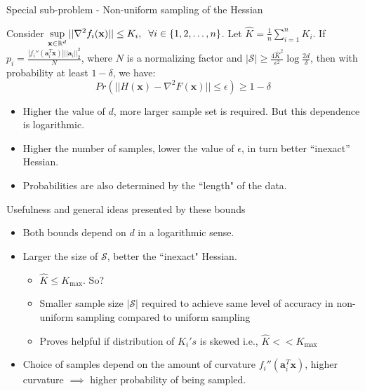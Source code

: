 \documentclass[10pt]{beamer}
\newcommand{\h}{\nabla^{2}}
\newcommand{\xbold}{\mathbf{x}}
\begin{document}
\begin{frame}{Special sub-problem - Non-uniform sampling of the Hessian}
\begin{theorem}
Consider \(\displaystyle \sup_{\xbold\in\mathbb{R}^{d}} ||\h f_{i}(\xbold)|| \leq K_{i}, \hspace{2mm} \forall i \in \{1, 2, \ldots, n\}\). Let \(\hat{K} = \frac{1}{n}\sum_{i=1}^{n} K_{i}\). If \(p_{i} = \displaystyle \frac{|f_{i}''(\mathbf{a}_{i}^{T}\xbold)| ||\mathbf{a}_{i}||^{2}_{2}}{N}\), where \(N\) is a normalizing factor and \(|\mathcal{S}| \geq \frac{4\hat{K}^{2}}{\epsilon^{2}}\log\frac{2d}{\delta}\), then with probability at least \(1 - \delta\), we have:
\begin{equation}
Pr\left(||H(\xbold) - \h F(\xbold)|| \leq \epsilon\right) \geq 1 - \delta
\end{equation}
\end{theorem}
\pause
{}
\begin{itemize}
\item<3->{Higher the value of \(d\), more larger sample set is required. But this dependence is logarithmic.}
\item<4->{Higher the number of samples, lower the value of \(\epsilon\), in turn better ``inexact'' Hessian.}
\item<5->{Probabilities are also determined by the ``length" of the data.}
\end{itemize}
\end{frame}

\begin{frame}{Usefulness and general ideas presented by these bounds}
\begin{itemize}
\item<1->{Both bounds depend on \(d\) in a logarithmic sense.}
\item<2->{Larger the size of \(\mathcal{S}\), better the ``inexact" Hessian.
  \begin{itemize}
    \item<3->{\(\hat{K} \leq K_{\max}\). So?}
    \item<4->{Smaller sample size \(|\mathcal{S}|\) required to achieve same level of accuracy in non-uniform sampling compared to uniform sampling}
    \item<5->{Proves helpful if distribution of \(K_{i}'s\) is skewed i.e., \(\hat{K} << K_{\max}\)}
  \end{itemize}
}
\item<6->{Choice of samples depend on the amount of curvature \(f_{i}''(\mathbf{a}_{i}^{T}\xbold)\), higher curvature \(\implies\) higher probability of being sampled.}
\end{itemize}
\end{frame}
\end{document}
